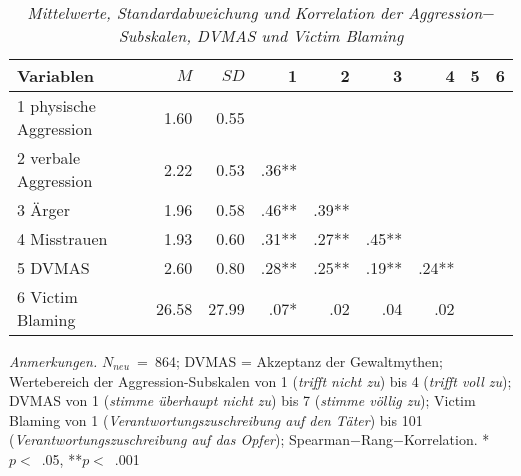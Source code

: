 \begin{table}[htb]
    \caption[Mittelwerte, Standardabweichung und Korrelation der Aggression$-$Subskalen, DVMAS und Victim Blaming]{\textit {Mittelwerte, Standardabweichung und Korrelation der Aggression$-$Subskalen, DVMAS und Victim Blaming}} 
    \label{lala}
    \centering
    \begin{adjustbox}{width=14cm} %
    \small
    \begin{tabular}{lrrrrrrrr}
      \hline
        Variablen             & $M$  & $SD$   & 1     & 2     & 3     & 4    & 5 & 6\\
       \hline
       1 physische Aggression & 1.60  & 0.55  &       &       &        &      & &\\
       2 verbale Aggression   & 2.22  & 0.53  & .36** &       &        &      & &\\
       3 Ärger                & 1.96  & 0.58  & .46** & .39** &        &      & &\\
       4 Misstrauen           & 1.93  & 0.60  & .31** & .27** & .45**  &      & &\\
       5 DVMAS                & 2.60  & 0.80  & .28** & .25** & .19**  & .24** & &\\
       6 Victim Blaming       & 26.58 & 27.99 & .07*  & .02   & .04    & .02   & & \\
    \end{tabular}
    \end{adjustbox}
    
    \begin{tablenotes}
        \item \textit{Anmerkungen.} \( N_{neu} \)~=~864; DVMAS = Akzeptanz der Gewaltmythen; Wertebereich der Aggression-Subskalen von 1 (\textit{trifft nicht zu}) bis 4 (\textit{trifft voll zu});  DVMAS von 1 (\textit{stimme überhaupt nicht zu}) bis 7 (\textit{stimme völlig zu}); Victim Blaming von 1 (\textit{Verantwortungszuschreibung auf den Täter}) bis 101 (\textit{Verantwortungszuschreibung auf das Opfer}); Spearman$-$Rang$-$Korrelation. *$p<$~.05, **$p<$~.001
      \end{tablenotes}
    \end{table}


